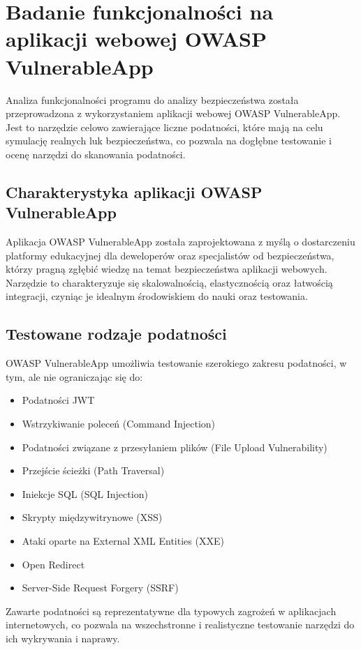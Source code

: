 \chapter{Badanie funkcjonalności na aplikacji webowej OWASP VulnerableApp}
\label{sec:badania_na_aplikacji_webowej_owasp}

Analiza funkcjonalności programu do analizy bezpieczeństwa została przeprowadzona z wykorzystaniem aplikacji webowej OWASP VulnerableApp. Jest to narzędzie celowo zawierające liczne podatności, które mają na celu symulację realnych luk bezpieczeństwa, co pozwala na dogłębne testowanie i ocenę narzędzi do skanowania podatności.

\section{Charakterystyka aplikacji OWASP VulnerableApp}
Aplikacja OWASP VulnerableApp została zaprojektowana z myślą o dostarczeniu platformy edukacyjnej dla deweloperów oraz specjalistów od bezpieczeństwa, którzy pragną zgłębić wiedzę na temat bezpieczeństwa aplikacji webowych. Narzędzie to charakteryzuje się skalowalnością, elastycznością oraz łatwością integracji, czyniąc je idealnym środowiskiem do nauki oraz testowania.

\section{Testowane rodzaje podatności}
OWASP VulnerableApp umożliwia testowanie szerokiego zakresu podatności, w tym, ale nie ograniczając się do:

\begin{itemize}
    \item Podatności JWT
    \item Wstrzykiwanie poleceń (Command Injection)
    \item Podatności związane z przesyłaniem plików (File Upload Vulnerability)
    \item Przejście ścieżki (Path Traversal)
    \item Iniekcje SQL (SQL Injection)
    \item Skrypty międzywitrynowe (XSS)
    \item Ataki oparte na External XML Entities (XXE)
    \item Open Redirect
    \item Server-Side Request Forgery (SSRF)
\end{itemize}

Zawarte podatności są reprezentatywne dla typowych zagrożeń w aplikacjach internetowych, co pozwala na wszechstronne i realistyczne testowanie narzędzi do ich wykrywania i naprawy.

